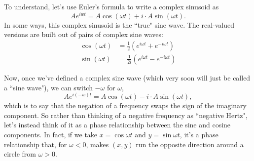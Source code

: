 \documentclass[12pt,preprint]{aastex}
\begin{document}
To understand, let's use
Euler's formula to write a complex sinusoid as
\begin{equation}
Ae^{iwt} = A\cos(\omega t) + i\cdot A\sin(\omega t).
\end{equation}
In some ways, this complex sinusoid is the ``true" sine wave.  The real-valued
versions are built out of pairs of complex sine waves:
\begin{align}
\cos(\omega t) &= \frac12(e^{i\omega t} + e^{-i\omega t}) \\
\sin(\omega t) &= \frac1{2i}(e^{i\omega t} - e^{-i\omega t})
\end{align}

Now, once we've defined a complex sine wave (which very soon will just be
called a ``sine wave"), we can switch $-\omega$
for $\omega$,
\begin{equation}
Ae^{i(-w)t} = A\cos(\omega t) - i\cdot A\sin(\omega t),
\end{equation}
which is to say that the negation of a frequency swaps the sign of the imaginary 
component.  So rather than thinking of a negative frequency as ``negative Hertz",
let's instead think of it as a phase relationship between the sine and cosine components.
In fact, if we take $x=\cos\omega t$ and $y=\sin\omega t$, it's a phase relationship that,
for $\omega<0$, makes $(x,y)$ run the opposite direction around a circle from $\omega>0$.
\end{document}
